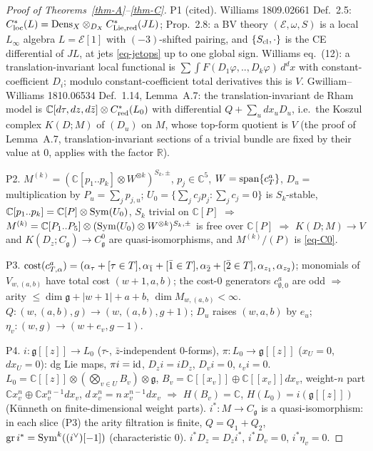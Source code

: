 \documentclass[10pt,a4paper]{article}
\numberwithin{equation}{section}
\theoremstyle{definition}
\theoremstyle{remark}
\newcommand{\g}{\mathfrak g}
\newcommand{\zb}{\bar z}
\newcommand{\Cg}{C^0_{\g}}
\begin{document}
\begin{proof}[Proof of Theorems~\ref{thm-A}--\ref{thm-C}]
P1 (cited). Williams 1809.02661 \cite{Wil} Def.~2.5: $C^*_{\rm loc}(L)={\rm Dens}_X\otimes_{D_X}C^*_{\rm Lie,red}(JL)$; Prop.~2.8: a BV theory $(\mathcal E,\omega,S)$ is a local $L_\infty$ algebra $L=\mathcal E[1]$ with $(-3)$-shifted pairing, and $\{S_{\rm cl},\cdot\}$ is the CE differential of $JL$, at jets \eqref{eq-jetops} up to one global sign. Williams eq.~(12): a translation-invariant local functional is $\sum\int F(D_1\varphi,..,D_k\varphi)\,d^dx$ with constant-coefficient $D_i$; modulo constant-coefficient total derivatives this is $V$. Gwilliam--Williams 1810.06534 \cite{GW18} Def.~1.14, Lemma~A.7: the translation-invariant de Rham model is $\mathbb C[d\tau,dz,d\zb]\otimes C^*_{\rm red}(L_0)$ with differential $Q+\sum_udx_uD_u$, i.e.\ the Koszul complex $K(D;M)$ of $(D_u)$ on $M$, whose top-form quotient is $V$ (the proof of Lemma~A.7, translation-invariant sections of a trivial bundle are fixed by their value at $0$, applies with the factor $\mathbb R$).

P2. $M^{(k)}=(\mathbb C[p_1..p_k]\otimes W^{\otimes k})^{S_k,\pm}$, $p_j\in\mathbb C^5$, $W={\rm span}\{c^a_T\}$, $D_u=$ multiplication by $P_u=\sum_jp_{j,u}$; $U_0=\{\sum_jc_jp_j:\sum_jc_j=0\}$ is $S_k$-stable, $\mathbb C[p_1..p_k]=\mathbb C[P]\otimes{\rm Sym}(U_0)$, $S_k$ trivial on $\mathbb C[P]$ $\Rightarrow$ $M^{(k)}=\mathbb C[P_1..P_5]\otimes({\rm Sym}(U_0)\otimes W^{\otimes k})^{S_k,\pm}$ is free over $\mathbb C[P]$ $\Rightarrow$ $K(D;M)\to V$ and $K(D_z;C_\g)\to\Cg$ are quasi-isomorphisms, and $M^{(k)}/(P)$ is \eqref{eq-C0}.

P3. ${\rm cost}(c^a_{T,\alpha})=(\alpha_\tau+[\tau\in T],\alpha_{\bar1}+[\bar1\in T],\alpha_{\bar2}+[\bar2\in T],\alpha_{z_1},\alpha_{z_2})$; monomials of $V_{w,(a,b)}$ have total cost $(w+1,a,b)$; the cost-$0$ generators $c^a_{\emptyset,0}$ are odd $\Rightarrow$ arity $\le\dim\g+|w+1|+a+b$, $\dim M_{w,(a,b)}<\infty$. $Q:(w,(a,b),g)\to(w,(a,b),g+1)$; $D_u$ raises $(w,a,b)$ by $e_u$; $\eta_v:(w,g)\to(w+e_v,g-1)$.

P4. $i:\g[[z]]\to L_0$ ($\tau$-, $\zb$-independent $0$-forms), $\pi:L_0\to\g[[z]]$ ($x_U=0$, $dx_U=0$): dg Lie maps, $\pi i={\rm id}$, $D_zi=iD_z$, $D_vi=0$, $\iota_vi=0$. $L_0=\mathbb C[[z]]\otimes(\bigotimes_{v\in U}B_v)\otimes\g$, $B_v=\mathbb C[[x_v]]\oplus\mathbb C[[x_v]]dx_v$, weight-$n$ part $\mathbb Cx_v^n\oplus\mathbb Cx_v^{n-1}dx_v$, $d\,x_v^n=n\,x_v^{n-1}dx_v$ $\Rightarrow$ $H(B_v)=\mathbb C$, $H(L_0)=i(\g[[z]])$ (K\"unneth on finite-dimensional weight parts). $i^*:M\to C_\g$ is a quasi-isomorphism: in each slice (P3) the arity filtration is finite, $Q=Q_1+Q_2$, ${\rm gr}\,i^*={\rm Sym}^k((i^\vee)[-1])$ (characteristic $0$). $i^*D_z=D_zi^*$, $i^*D_v=0$, $i^*\eta_v=0$.


\end{proof}
\end{document}
